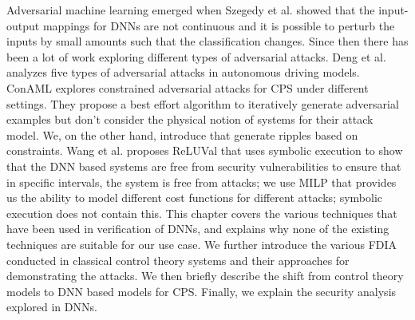 Adversarial machine learning emerged when Szegedy et al.  \cite{Szegedy2013IntriguingPO} showed that the input-output mappings for \ac{DNN}s are not continuous and it is possible to perturb the inputs by small amounts such that the classification changes. 
Since then there has been a lot of work exploring different types of adversarial attacks. Deng et al. \cite{deng2020analysis} analyzes five types of adversarial attacks in autonomous driving models. 
ConAML \cite{li2020conaml} explores constrained adversarial attacks for \ac{CPS} under different settings. They propose a best effort algorithm to iteratively generate adversarial examples but don't consider the physical notion of systems for their attack model. We, on the other hand, introduce \attack  that generate ripples based on constraints. 
Wang et al. \cite{217595} proposes ReLUVal that uses symbolic execution to show that the DNN based systems are free from security vulnerabilities to ensure that in specific intervals, the system is free from attacks; we use MILP that provides us the ability to model different cost functions for different attacks; symbolic execution does not contain this. 
\newline 
\newline 
This chapter covers the various techniques that have been used in verification of DNNs, and explains why none of the existing techniques are suitable for our use case. 
We further introduce the various \ac{FDIA} conducted in classical control theory systems and their approaches for demonstrating the attacks. 
We then briefly describe the shift from control theory models to \ac{DNN} based models for \ac{CPS}.
Finally, we explain the security analysis explored in \ac{DNN}s. 